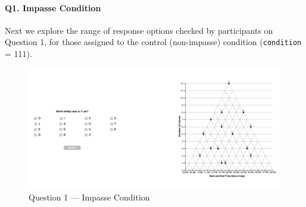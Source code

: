 \documentclass[
  letterpaper,
  DIV=11,
  numbers=noendperiod]{scrreprt}
\let\oldparagraph\paragraph
\renewcommand{\paragraph}[1]{\oldparagraph{#1}\mbox{}}
\begin{document}
\hypertarget{q1.-impasse-condition}{%
\paragraph{Q1. Impasse Condition}\label{q1.-impasse-condition}}

Next we explore the range of response options checked by participants on
Question 1, for those assigned to the control (non-impasse) condition
(\texttt{condition} = 111).

\begin{figure}

{\centering \includegraphics{analysis/SGC3A/static/questions/Q1_121.png}

}

\caption{\label{fig-Q1-121}Question 1 --- Impasse Condition}

\end{figure}
\end{document}
